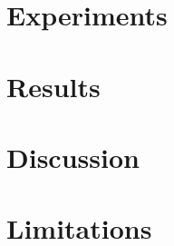 \documentclass{article}
\begin{document}
\section{Experiments}
\label{sec:exp}

\section{Results}
\label{sec:results}



\section{Discussion}
\label{sec:discussion}

\section{Limitations}
\label{sec:limitations}
\end{document}
